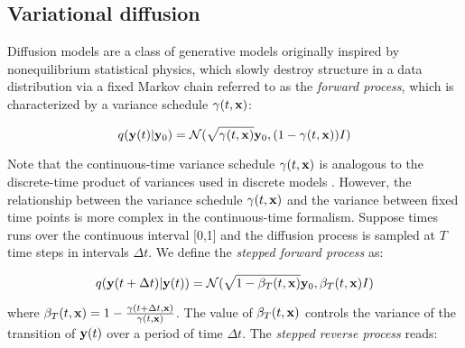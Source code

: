 

\subsection{Variational diffusion}

Diffusion models \parencite{Ho2020,Song2021} are a class of generative models originally inspired by nonequilibrium statistical physics, which slowly destroy structure in a data distribution via a fixed Markov chain referred to as the \emph{forward process}, which is characterized by a variance schedule $\gamma(t,\bold{x})$:

\begin{equation*}
q(\bold{y}(t)\lvert\bold{y}_{0}) = \mathcal{N}(\sqrt{\gamma(t,\bold{x})}\bold{y}_{0},(1-\gamma(t,\bold{x}))I)
\end{equation*}

Note that the continuous-time variance schedule $\gamma(t,\bold{x})$ is analogous to the discrete-time product of variances used in discrete models \parencite{Ho2020}. However, the relationship between the variance schedule $\gamma(t,\bold{x})$ and the variance between fixed time points is more complex in the continuous-time formalism. Suppose times runs over the continuous interval [0,1] and the diffusion process is sampled at $T$ time steps in intervals $\Delta t$. We define the \emph{stepped forward process} as:

\begin{equation*}
q(\bold{y}(t+\Delta t)\lvert\bold{y}(t)) = \mathcal{N}(\sqrt{1-\beta_{T}(t,\bold{x})}\bold{y}_{0},\beta_{T}(t,\bold{x})I)
\end{equation*}

where $\beta_{T}(t,\bold{x}) = 1 - \frac{\gamma(t+\Delta t,\bold{x})}{\gamma(t,\bold{x})}$. The value of $\beta_{T}(t,\bold{x})$ controls the variance of the transition of $\bold{y}(t)$ over a period of time $\Delta t$. The \emph{stepped reverse process} reads:

